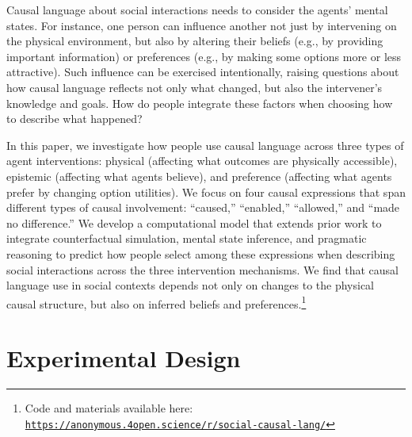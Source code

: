 \documentclass[10pt,letterpaper]{article}
\begin{document}
Causal language about social interactions needs to consider the agents' mental states.  
For instance, one person can influence another not just by intervening on the physical environment, but also by altering their beliefs (e.g., by providing important information) or preferences (e.g., by making some options more or less attractive).
Such influence can be exercised intentionally, raising questions about how causal language reflects not only what changed, but also the intervener's knowledge and goals.
How do people integrate these factors when choosing how to describe what happened? 

In this paper, we investigate how people use causal language across three types of agent interventions: physical (affecting what outcomes are physically accessible), epistemic (affecting what agents believe), and preference (affecting what agents prefer by changing option utilities). 
We focus on four causal expressions that span different types of causal involvement: ``caused,'' ``enabled,'' ``allowed,'' and ``made no difference.'' 
We develop a computational model that extends prior work to 
integrate counterfactual simulation, mental state inference, and pragmatic reasoning to predict how people select among these expressions when describing social interactions across the three intervention mechanisms.
We find that causal language use in social contexts depends not only on changes to the physical causal structure, but also on inferred beliefs and preferences.\footnote{Code and materials available here: \texttt{\url{https://anonymous.4open.science/r/social-causal-lang/}}}

\section{Experimental Design}
\end{document}
